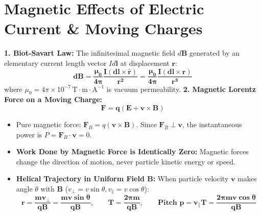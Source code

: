 \documentclass[10pt,twoside,openright]{book}
\begin{document}
\section{Magnetic Effects of Electric Current \& Moving Charges}

\begin{conceptbox}
\textbf{1. Biot-Savart Law:}
The infinitesimal magnetic field $d\mathbf{B}$ generated by an elementary current length vector $I d\mathbf{l}$ at displacement $\mathbf{r}$:
\begin{equation}
  \mathbf{d\mathbf{B} = \frac{\mu_0}{4\pi} \frac{I (d\mathbf{l} \times \hat{\mathbf{r}})}{r^2} = \frac{\mu_0}{4\pi} \frac{I (d\mathbf{l} \times \mathbf{r})}{r^3}}
\end{equation}
where $\mu_0 = 4\pi \times 10^{-7}\,\mathrm{T}\cdot\mathrm{m}\cdot\mathrm{A}^{-1}$ is vacuum permeability.
\textbf{2. Magnetic Lorentz Force on a Moving Charge:}
\begin{equation}
  \mathbf{\mathbf{F} = q(\mathbf{E} + \mathbf{v} \times \mathbf{B})}
\end{equation}
\begin{itemize}
  \item Pure magnetic force: $\mathbf{F}_B = q(\mathbf{v} \times \mathbf{B})$. Since $\mathbf{F}_B \perp \mathbf{v}$, the instantaneous power is $P = \mathbf{F}_B \cdot \mathbf{v} = 0$.
  \item \textbf{Work Done by Magnetic Force is Identically Zero:} Magnetic forces change the direction of motion, never particle kinetic energy or speed.
  \item \textbf{Helical Trajectory in Uniform Field $\mathbf{B}$:}
  When particle velocity $\mathbf{v}$ makes angle $\theta$ with $\mathbf{B}$ ($v_\perp = v\sin\theta, v_\parallel = v\cos\theta$):
  \begin{equation}
    \mathbf{r = \frac{m v_\perp}{q B} = \frac{m v \sin\theta}{q B}}, \qquad \mathbf{T = \frac{2\pi m}{q B}}, \qquad \mathbf{\text{Pitch } p = v_\parallel T = \frac{2\pi m v \cos\theta}{q B}}
  \end{equation}
\end{itemize}
\end{conceptbox}
\end{document}
